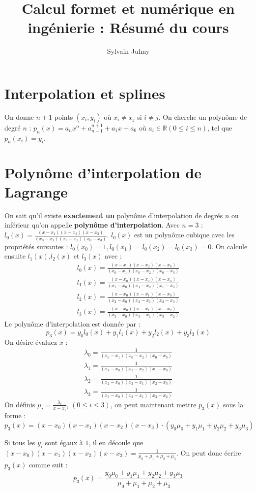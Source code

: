 \documentclass[a4paper,9pt]{extarticle}
\author{Sylvain Julmy}
\title{Calcul formet et numérique en ingénierie : Résumé du cours}
\begin{document}
\section{Interpolation et splines}

On donne $n+1$ points $(x_i,y_i)$ où $x_i\neq x_j$ si $i\neq j$. On cherche un polynôme de degré $n$ : $p_n(x)=a_nx^n+a_{n-1}^{n+1}+a_1x+a_0$ où $a_i\in \mathbb{R}(0 \leq i \leq n)$, tel que $p_n(x_i)=y_i$.

\section{Polynôme d'interpolation de Lagrange}

On sait qu'il existe \textbf{exactement un} polynôme d'interpolation de degrés $n$ ou inférieur qu'on appelle \textbf{polynôme d'interpolation}. Avec $n=3$ :
$l_0(x)=\frac{(x-x_1)(x-x_2)(x-x_3)}{(x_0-x_1)(x_0-x_2)(x_0-x_3)}$. $l_0(x)$ est un polynôme cubique avec les propriétés suivantes : $l_0(x_0)=1,l_0(x_1)=l_0(x_2)=l_0(x_3)=0$. On calcule ensuite $l_1(x)$,$l_2(x)$ et $l_3(x)$ avec :
\begin{align*}
l_0(x)=\frac{(x-x_1)(x-x_2)(x-x_3)}{(x_0-x_1)(x_0-x_2)(x_0-x_3)} \\
l_1(x)=\frac{(x-x_0)(x-x_2)(x-x_3)}{(x_1-x_0)(x_1-x_2)(x_1-x_3)} \\
l_2(x)=\frac{(x-x_0)(x-x_1)(x-x_3)}{(x_2-x_0)(x_2-x_1)(x_2-x_3)} \\
l_3(x)=\frac{(x-x_0)(x-x_1)(x-x_2)}{(x_3-x_0)(x_3-x_1)(x_3-x_2)}
\end{align*}
Le polynôme d'interpolation est donnée par :
$$
p_3(x) = y_0l_0(x)+y_1l_1(x)+y_2l_2(x)+y_3l_3(x)
$$
On désire évaluez $x$ :
\begin{align*}
\lambda_0 = \frac{1}{(x_0-x_1)(x_0-x_2)(x_0-x_3)} \\
\lambda_1 = \frac{1}{(x_1-x_0)(x_1-x_2)(x_1-x_3)} \\
\lambda_2 = \frac{1}{(x_2-x_0)(x_2-x_1)(x_2-x_3)} \\
\lambda_3 = \frac{1}{(x_3-x_0)(x_3-x_1)(x_3-x_2)}
\end{align*}
On définis $\mu_i=\frac{\lambda_i}{x-x_i}$, $(0\leq i \leq 3)$, on peut maintenant mettre $p_3(x)$ sous la forme :
$$
p_3(x)=(x-x_0)(x-x_1)(x-x_2)(x-x_3)\cdot (y_0\mu_0+y_1\mu_1+y_2\mu_2+y_3\mu_3)
$$

Si tous les $y_i$ sont égaux à $1$, il en découle que $(x-x_0)(x-x_1)(x-x_2)(x-x_3)=\frac{1}{\mu_0+\mu_1+\mu_2+\mu_3}$. On peut donc écrire $p_3(x)$ comme suit :
$$
p_3(x) = \frac{y_0\mu_0+y_1\mu_1+y_2\mu_2+y_3\mu_3}{\mu_0+\mu_1+\mu_2+\mu_3}
$$
\end{document}
